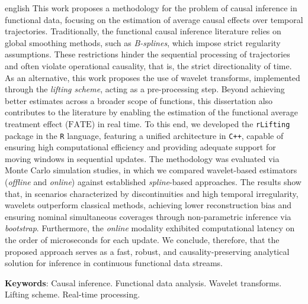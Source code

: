 \begin{resumo}[Abstract]
 \begin{otherlanguage*}{english}
    This work proposes a methodology for the problem of causal inference in functional data, focusing on the estimation of average causal effects over temporal trajectories. Traditionally, the functional causal inference literature relies on global smoothing methods, such as \emph{B-splines}, which impose strict regularity assumptions. These restrictions hinder the sequential processing of trajectories and often violate operational causality, that is, the strict directionality of time. As an alternative, this work proposes the use of wavelet transforms, implemented through the \emph{lifting scheme}, acting as a pre-processing step. Beyond achieving better estimates across a broader scope of functions, this dissertation also contributes to the literature by enabling the estimation of the functional average treatment effect (\(\mathrm{FATE}\)) in real time. To this end, we developed the \texttt{rLifting} package in the \texttt{R} language, featuring a unified architecture in \texttt{C++}, capable of ensuring high computational efficiency and providing adequate support for moving windows in sequential updates. The methodology was evaluated via Monte Carlo simulation studies, in which we compared wavelet-based estimators (\emph{offline} and \emph{online}) against established \emph{spline}-based approaches. The results show that, in scenarios characterized by discontinuities and high temporal irregularity, wavelets outperform classical methods, achieving lower reconstruction bias and ensuring nominal simultaneous coverages through non-parametric inference via \emph{bootstrap}. Furthermore, the \emph{online} modality exhibited computational latency on the order of microseconds for each update. We conclude, therefore, that the proposed approach serves as a fast, robust, and causality-preserving analytical solution for inference in continuous functional data streams.
    
    \textbf{Keywords}: Causal inference. Functional data analysis. Wavelet transforms. Lifting scheme. Real-time processing.
 \end{otherlanguage*}
\end{resumo}
